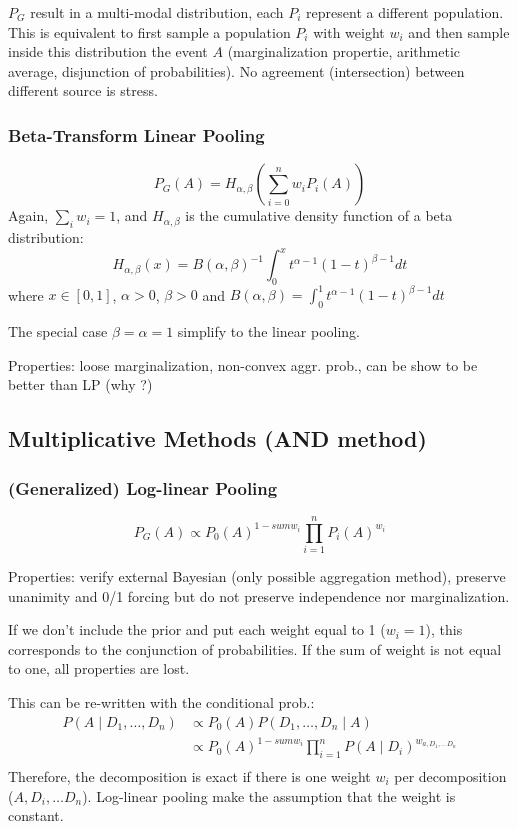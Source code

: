 \documentclass[twocolumn]{article}
\numberwithin{equation}{section}
\begin{document}
$P_G$ result in a multi-modal distribution, each $P_i$ represent a different population. This is equivalent to first sample a population $P_i$ with weight $w_i$ and then sample inside this distribution the event $A$ (marginalization propertie, arithmetic average, disjunction of probabilities). No agreement (intersection) between different source is stress.

		\subsubsection{Beta-Transform Linear Pooling}
$$P_G(A) = H_{\alpha,\beta}\left( \sum_{i=0}^n w_i P_i(A) \right)$$
Again, $\sum_i w_i=1$, and $H_{\alpha,\beta}$ is the cumulative density function of a beta distribution:
$$H_{\alpha,\beta}(x)= B(\alpha,\beta)^{-1} \int_0^x t^{\alpha-1}(1-t)^{\beta-1} dt $$
where $x\in [0,1]$, $\alpha> 0$, $\beta> 0$  and $B(\alpha,\beta)=\int_0^1 t^{\alpha-1}(1-t)^{\beta-1} dt$

The special case $\beta=\alpha=1$ simplify to the linear pooling. 

Properties: loose marginalization, non-convex aggr. prob., can be show to be better than LP (why ?)

	\subsection{Multiplicative Methods (AND method)} 	
		\subsubsection{(Generalized) Log-linear Pooling} 
$$P_G(A) \propto P_0(A)^{1-sum w_i} \prod_{i=1}^n P_i(A)^{w_i}$$

Properties: verify external Bayesian (only possible aggregation method), preserve unanimity and  0/1 forcing but do not preserve independence nor marginalization. 

If we don't include the prior and put each weight equal to 1 ($w_i=1$), this corresponds to the conjunction of probabilities. 
If the sum of weight is not equal to one, all properties are lost.

This can be re-written with the conditional prob.:
\begin{align*} 
P(A \mid D_1,\ldots,D_n)	& \propto P_0(A) P(D_1,\ldots,D_n\mid A)\\ 
						& \propto P_0(A)^{1-sum w_i} \prod_{i=1}^n P(A \mid D_i)^{w_{a,D_1,\ldots D_n}}\\ 
\end{align*}
Therefore, the decomposition is exact if there is one weight $w_i$ per decomposition ($A,D_i,\ldots D_n$). Log-linear pooling make the assumption that the weight is constant.
\end{document}
